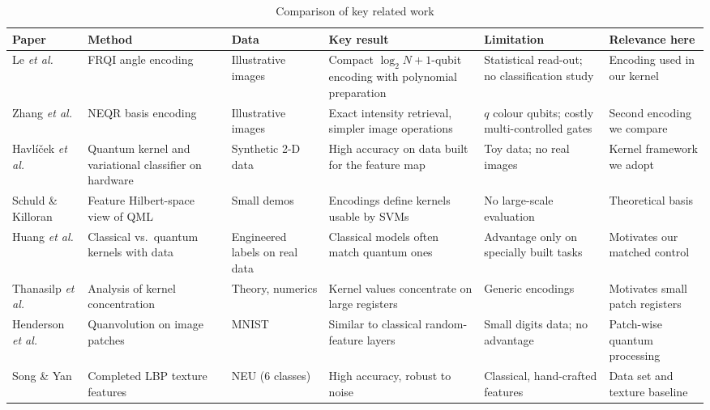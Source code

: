 \documentclass[12pt,onecolumn,draftclsnofoot]{IEEEtran}
\begin{document}
\begin{table}[!t]
\centering
\caption{Comparison of key related work}
\label{tab:related}
\renewcommand{\baselinestretch}{1.1}\footnotesize
\begin{tabularx}{\linewidth}{@{}L{1.6cm}L{2.1cm}L{1.6cm}YYL{2.1cm}@{}}
\toprule
Paper & Method & Data & Key result & Limitation & Relevance here\\
\midrule
Le \emph{et al.} \cite{le2011frqi} & FRQI angle encoding & Illustrative images & Compact $\log_2N{+}1$-qubit encoding with polynomial preparation & Statistical read-out; no classification study & Encoding used in our kernel\\
Zhang \emph{et al.} \cite{zhang2013neqr} & NEQR basis encoding & Illustrative images & Exact intensity retrieval, simpler image operations & $q$ colour qubits; costly multi-controlled gates & Second encoding we compare\\
Havl\'{i}\v{c}ek \emph{et al.} \cite{havlicek2019} & Quantum kernel and variational classifier on hardware & Synthetic 2-D data & High accuracy on data built for the feature map & Toy data; no real images & Kernel framework we adopt\\
Schuld \& Killoran \cite{schuld2019feature} & Feature Hilbert-space view of QML & Small demos & Encodings define kernels usable by SVMs & No large-scale evaluation & Theoretical basis\\
Huang \emph{et al.} \cite{huang2021power} & Classical vs.\ quantum kernels with data & Engineered labels on real data & Classical models often match quantum ones & Advantage only on specially built tasks & Motivates our matched control\\
Thanasilp \emph{et al.} \cite{thanasilp2024} & Analysis of kernel concentration & Theory, numerics & Kernel values concentrate on large registers & Generic encodings & Motivates small patch registers\\
Henderson \emph{et al.} \cite{henderson2020quanv} & Quanvolution on image patches & MNIST & Similar to classical random-feature layers & Small digits data; no advantage & Patch-wise quantum processing\\
Song \& Yan \cite{song2013neu} & Completed LBP texture features & NEU (6 classes) & High accuracy, robust to noise & Classical, hand-crafted features & Data set and texture baseline\\
\bottomrule
\end{tabularx}
\end{table}

\end{document}
